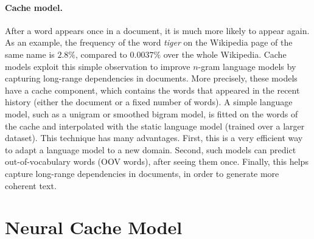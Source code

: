 \documentclass{article} \usepackage{iclr2017_conference,times}
\begin{document}
\paragraph{Cache model.}
After a word appears once in a document, it is much more likely to appear again.
As an example, the frequency of the word \emph{tiger} on the Wikipedia page of the same name is $2.8\%$, compared to $0.0037\%$ over the whole Wikipedia.
Cache models exploit this simple observation to improve $n$-gram language models by capturing long-range dependencies in documents.
More precisely, these models have a cache component, which contains the words that appeared in the recent history (either the document or a fixed number of words).
A simple language model, such as a unigram or smoothed bigram model, is fitted on the words of the cache and interpolated with the static language model (trained over a larger dataset).
This technique has many advantages.
First, this is a very efficient way to adapt a language model to a new domain.
Second, such models can predict out-of-vocabulary words (OOV words), after seeing them once.
Finally, this helps capture long-range dependencies in documents, in order to generate more coherent text.

 
\newpage
\section{Neural Cache Model}
\end{document}
